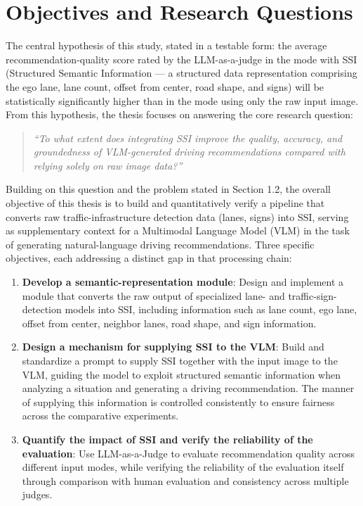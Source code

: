 \documentclass[12pt,a4paper]{report}
\begin{document}
\section{Objectives and Research Questions}

The central hypothesis of this study, stated in a testable form: the average recommendation-quality score rated by the LLM-as-a-judge in the mode with SSI (Structured Semantic Information --- a structured data representation comprising the ego lane, lane count, offset from center, road shape, and signs) will be statistically significantly higher than in the mode using only the raw input image. From this hypothesis, the thesis focuses on answering the core research question:

\begin{quote}
\textit{``To what extent does integrating SSI improve the quality, accuracy, and groundedness of VLM-generated driving recommendations compared with relying solely on raw image data?''}
\end{quote}

Building on this question and the problem stated in Section 1.2, the overall objective of this thesis is to build and quantitatively verify a pipeline that converts raw traffic-infrastructure detection data (lanes, signs) into SSI, serving as supplementary context for a Multimodal Language Model (VLM) in the task of generating natural-language driving recommendations. Three specific objectives, each addressing a distinct gap in that processing chain:

\begin{enumerate}
    \item \textbf{Develop a semantic-representation module}: Design and implement a module that converts the raw output of specialized lane- and traffic-sign-detection models into SSI, including information such as lane count, ego lane, offset from center, neighbor lanes, road shape, and sign information.
    \item \textbf{Design a mechanism for supplying SSI to the VLM}: Build and standardize a prompt to supply SSI together with the input image to the VLM, guiding the model to exploit structured semantic information when analyzing a situation and generating a driving recommendation. The manner of supplying this information is controlled consistently to ensure fairness across the comparative experiments.
    \item \textbf{Quantify the impact of SSI and verify the reliability of the evaluation}: Use LLM-as-a-Judge to evaluate recommendation quality across different input modes, while verifying the reliability of the evaluation itself through comparison with human evaluation and consistency across multiple judges.
\end{enumerate}
\end{document}
